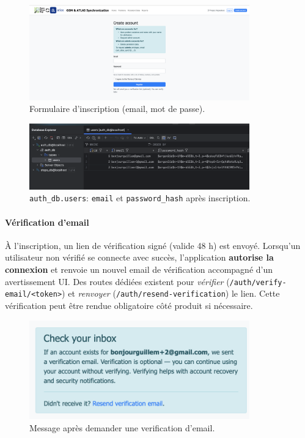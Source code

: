 \begin{figure}[H]
  \centering
  \includegraphics[width=0.85\textwidth]{../figures/chap10/create_account.png}
  \caption{Formulaire d'inscription (email, mot de passe).}
\end{figure}

\begin{figure}[H]
  \centering
  \includegraphics[width=0.85\textwidth]{../figures/chap10/auth_db1.png}
  \caption{\texttt{auth\_db.users}: \texttt{email} et \texttt{password\_hash} après inscription.}
\end{figure}

\paragraph{Vérification d'email}
À l'inscription, un lien de vérification signé (valide 48 h) est envoyé. Lorsqu'un utilisateur non vérifié se connecte avec succès, l'application \textbf{autorise la connexion} et renvoie un nouvel email de vérification accompagné d'un avertissement UI. Des routes dédiées existent pour \textit{vérifier} (\texttt{/auth/verify-email/<token>}) et \textit{renvoyer} (\texttt{/auth/resend-verification}) le lien. Cette vérification peut être rendue obligatoire côté produit si nécessaire.

\begin{figure}[H]
  \centering
  \includegraphics[width=0.85\textwidth]{../figures/chap10/message after clicking email verification.png}
  \caption{Message après demander une verification d'email.}
\end{figure}

